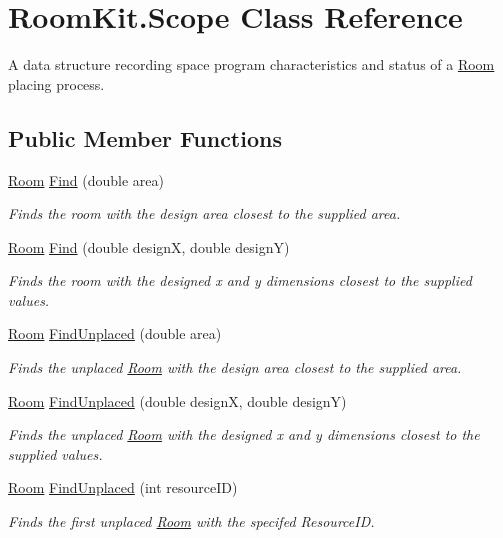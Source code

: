 \hypertarget{class_room_kit_1_1_scope}{}\section{Room\+Kit.\+Scope Class Reference}
\label{class_room_kit_1_1_scope}


A data structure recording space program characteristics and status of a \mbox{\hyperlink{class_room_kit_1_1_room}{Room}} placing process.  


\subsection*{Public Member Functions}
\begin{DoxyCompactItemize}
\item 
\mbox{\hyperlink{class_room_kit_1_1_room}{Room}} \mbox{\hyperlink{class_room_kit_1_1_scope_a110cfe2a56ee1b74e80727785066f198}{Find}} (double area)
\begin{DoxyCompactList}\small\item\em Finds the room with the design area closest to the supplied area. \end{DoxyCompactList}\item 
\mbox{\hyperlink{class_room_kit_1_1_room}{Room}} \mbox{\hyperlink{class_room_kit_1_1_scope_a5891fa17bb22703dedc74dd4f35fb108}{Find}} (double designX, double designY)
\begin{DoxyCompactList}\small\item\em Finds the room with the designed x and y dimensions closest to the supplied values. \end{DoxyCompactList}\item 
\mbox{\hyperlink{class_room_kit_1_1_room}{Room}} \mbox{\hyperlink{class_room_kit_1_1_scope_a9b2db21ca0a8c36a085e3ce37d3655dc}{Find\+Unplaced}} (double area)
\begin{DoxyCompactList}\small\item\em Finds the unplaced \mbox{\hyperlink{class_room_kit_1_1_room}{Room}} with the design area closest to the supplied area. \end{DoxyCompactList}\item 
\mbox{\hyperlink{class_room_kit_1_1_room}{Room}} \mbox{\hyperlink{class_room_kit_1_1_scope_a8e29aceacafb32cc1f260e5906c75d71}{Find\+Unplaced}} (double designX, double designY)
\begin{DoxyCompactList}\small\item\em Finds the unplaced \mbox{\hyperlink{class_room_kit_1_1_room}{Room}} with the designed x and y dimensions closest to the supplied values. \end{DoxyCompactList}\item 
\mbox{\hyperlink{class_room_kit_1_1_room}{Room}} \mbox{\hyperlink{class_room_kit_1_1_scope_a59398f2335bda913a9f8ebb5f212fc06}{Find\+Unplaced}} (int resource\+ID)
\begin{DoxyCompactList}\small\item\em Finds the first unplaced \mbox{\hyperlink{class_room_kit_1_1_room}{Room}} with the specifed Resource\+ID. \end{DoxyCompactList}\end{DoxyCompactItemize}
